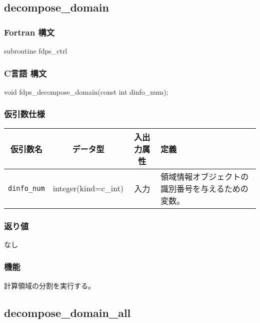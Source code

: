 \subsection{decompose\_domain}
\subsubsection*{Fortran 構文}
\begin{screen}
\begin{spverbatim}
subroutine fdps_ctrl%
\end{spverbatim}
\end{screen}

\subsubsection*{C言語 構文}
\begin{screen}
\begin{spverbatim}
void fdps_decompose_domain(const int dinfo_num);
\end{spverbatim}
\end{screen}


\subsubsection*{仮引数仕様}
\begin{table}[h]
\begin{tabularx}{\linewidth}{cccX}
\toprule
\rowcolor{Snow2}
仮引数名 & データ型 & 入出力属性 & 定義 \\
\midrule
\texttt{dinfo\_num} & integer(kind=c\_int) & 入力 & 領域情報オブジェクトの識別番号を与えるための変数。\\
\bottomrule
\end{tabularx}
\end{table}

\subsubsection*{返り値}
なし

\subsubsection*{機能}
計算領域の分割を実行する。

\clearpage

\subsection{decompose\_domain\_all}
